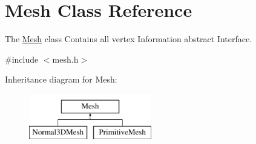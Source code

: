 \hypertarget{class_mesh}{}\section{Mesh Class Reference}
\label{class_mesh}


The \hyperlink{class_mesh}{Mesh} class Contains all vertex Information abstract Interface.  




{\ttfamily \#include $<$mesh.\+h$>$}

Inheritance diagram for Mesh\+:\begin{figure}[H]
\begin{center}
\leavevmode
\includegraphics[height=2.000000cm]{class_mesh}
\end{center}
\end{figure}
